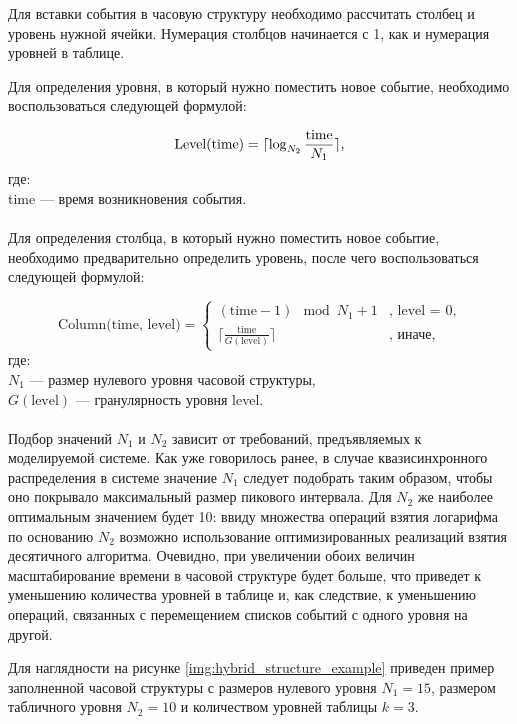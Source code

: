 Для вставки события в часовую структуру необходимо рассчитать столбец и уровень нужной ячейки. Нумерация столбцов начинается с 1, как и нумерация уровней в таблице.

Для определения уровня, в который нужно поместить новое событие, необходимо воспользоваться следующей формулой:

\begin{equation}
	\text{Level}(\text{time}) =  \lceil \log_{N_2} \frac{\text{time}}{N_1} \rceil \text{,} \\
\end{equation}
где: \\
time --- время возникновения события. \\ \\

Для определения столбца, в который нужно поместить новое событие, необходимо предварительно определить уровень, после чего воспользоваться следующей формулой:

\begin{equation}
	\text{Column(time, level)} = 
	\begin{cases}
		(\text{time} - 1) \mod N_1 + 1 & \text{, level = 0,} \\
		\lceil \frac{\text{time}}{G(\text{level})} \rceil & \text{, иначе,}
	\end{cases}
	\label{eq:column}
\end{equation}
где: \\
$N_1$ --- размер нулевого уровня часовой структуры, \\
$G(\text{level})$ --- гранулярность уровня level. \\ \\

Подбор значений $N_1$ и $N_2$ зависит от требований, предъявляемых к моделируемой системе. Как уже говорилось ранее, в случае квазисинхронного распределения в системе значение $N_1$ следует подобрать таким образом, чтобы оно покрывало максимальный размер пикового интервала. Для $N_2$ же наиболее оптимальным значением будет 10: ввиду множества операций взятия логарифма по основанию $N_2$ возможно использование оптимизированных реализаций взятия десятичного алгоритма. Очевидно, при увеличении обоих величин масштабирование времени в часовой структуре будет больше, что приведет к уменьшению количества уровней в таблице и, как следствие, к уменьшению операций, связанных с перемещением списков событий с одного уровня на другой.


Для наглядности на рисунке \ref{img:hybrid_structure_example} приведен пример заполненной часовой структуры с размеров нулевого уровня $N_1 = 15$, размером табличного уровня $N_2 = 10$ и количеством уровней таблицы $k = 3$.

